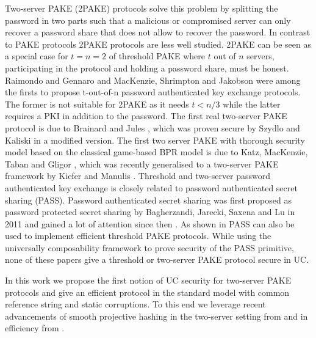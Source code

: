 Two-server PAKE (2PAKE) protocols solve this problem by splitting the password in two parts such that a malicious or compromised server can only recover a password share that does not allow to recover the password.
In contrast to PAKE protocols 2PAKE protocols are less well studied.
2PAKE can be seen as a special case for $t=n=2$ of threshold PAKE where $t$ out of $n$ servers, participating in the protocol and holding a password share, must be honest.
Raimondo and Gennaro \cite{Raimondo_Gennaro_2003} and MacKenzie, Shrimpton and Jakobson \cite{MacKenzie_Shrimpton_Jakobsson_2002} were among the firsts to propose t-out-of-n password authenticated key exchange protocols.
The former is not suitable for 2PAKE as it needs $t<n/3$ while the latter requires a PKI in addition to the password.
The first real two-server PAKE protocol is due to Brainard and Jules \cite{Brainard_Juels_2003}, which was proven secure by Szydlo and Kaliski \cite{SzydloK05} in a modified version.
The first two server PAKE with thorough security model based on the classical game-based BPR model is due to Katz, MacKenzie,  Taban and Gligor \cite{KatzMTB05}, which was recently generalised to a two-server PAKE framework by Kiefer and Manulis \cite{KieferM14a}.
Threshold and two-server password authenticated key exchange is closely related to password authenticated secret sharing (PASS).
Password authenticated secret sharing was first proposed as password protected secret sharing by Bagherzandi, Jarecki, Saxena and Lu in 2011 \cite{Bagherzandi2011} and gained a lot of attention since then \cite{Camenisch_Lysyanskaya_Neven_2012,JareckiKK14,CamenishEN15}.
As shown in \cite{JareckiKK14} PASS can also be used to implement efficient threshold PAKE protocols.
While using the universally composability framework to prove security of the PASS primitive, none of these papers give a threshold or two-server PAKE protocol secure in UC.

In this work we propose the first notion of UC security for two-server PAKE protocols and give an efficient protocol in the standard model with common reference string and static corruptions.
To this end we leverage recent advancements of smooth projective hashing in the two-server setting from \cite{KieferM14a} and in efficiency from \cite{Benhamouda2013}.

